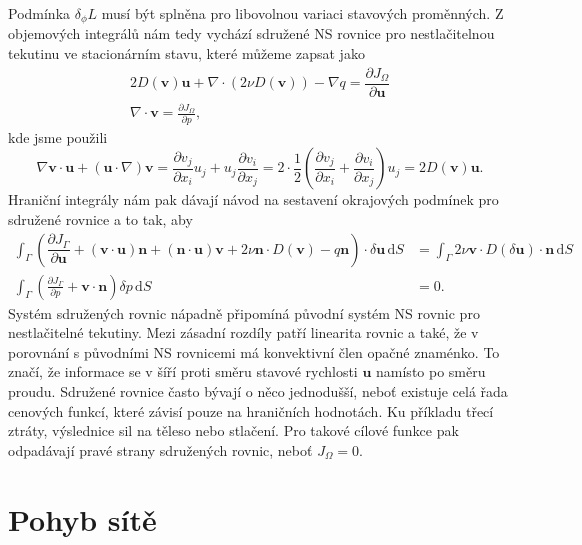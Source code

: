 Podmínka $ \delta_\phi L $ musí být splněna pro libovolnou variaci stavových proměnných. Z objemových integrálů nám tedy vychází sdružené NS rovnice pro nestlačitelnou tekutinu ve stacionárním stavu, které můžeme zapsat jako
\begin{align}
2D(\mathbf{v})\mathbf{u}
+ \nabla \cdot \left( 2\nu D(\mathbf{v}) \right)
- \nabla q 
=
\dfrac{\partial J_{\Omega}}{\partial \mathbf{u}} 
\\
\nabla \cdot \mathbf{v} 
= 
\frac{\partial J_\Omega}{\partial p},
\end{align}
kde jsme použili  
\begin{equation*}
\nabla \mathbf{v}\cdot \mathbf{u}
+ (\mathbf{u} \cdot \nabla)\mathbf{v} 
=
\frac{\partial v_j}{\partial x_i}  u_j + u_j  \frac{\partial v_i}{\partial x_j} 
=
2\cdot\frac{1}{2}
\left(
\frac{\partial v_j}{\partial x_i}
+ \frac{\partial v_i}{\partial x_j} 
\right)
u_j
=
2D(\mathbf{v})\mathbf{u}.
\end{equation*}
Hraniční integrály nám pak dávají návod na sestavení okrajových podmínek pro sdružené rovnice a to tak, aby
\begin{align}
\label{eq:sdruzenaOP1}
\int_{\Gamma}
\left(
\dfrac{\partial J_{\Gamma}}{\partial \mathbf{u}}
+ (\mathbf{v}\cdot \mathbf{u} )\mathbf{n} 
+ (\mathbf{n} \cdot \mathbf{u}) \mathbf{v}
+ 2\nu \mathbf{n} \cdot  D(\mathbf{v})
- q \mathbf{n}
\right)
\cdot \delta \mathbf{u}
\, \mathrm{d}S
&= 
\int_{\Gamma} 
2\nu \mathbf{v} \cdot  D(\delta \mathbf{u})\cdot \mathbf{n}
\, \mathrm{d}S
\\
\label{eq:sdruzenaOP2}
\int_{\Gamma}
\left(
\frac{\partial J_\Gamma}{\partial p}
+ \mathbf{v} \cdot \mathbf{n}
\right)
\delta p
\, \mathrm{d}S
&= 0.
\end{align}
Systém sdružených rovnic nápadně připomíná původní systém NS rovnic pro nestlačitelné tekutiny. Mezi zásadní rozdíly patří linearita rovnic a také, že v porovnání s původními NS rovnicemi má konvektivní člen opačné znaménko. To značí, že informace se v šíří proti směru stavové rychlosti $ \mathbf{u} $ namísto po směru proudu. Sdružené rovnice často bývají o něco jednodušší, neboť existuje celá řada cenových funkcí, které závisí pouze na hraničních hodnotách. Ku příkladu třecí ztráty, výslednice sil na těleso nebo stlačení. Pro takové cílové funkce pak odpadávají pravé strany sdružených rovnic, neboť $ J_\Omega = 0 $.


\section{Pohyb sítě}


